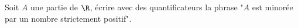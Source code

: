 Soit $A$ une partie de $\R$, \'{e}crire avec des quantificateurs la phrase "$A$ est minor\'ee par un nombre strictement positif".\bigskip \bigskip